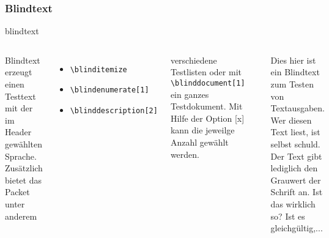 \subsubsection{Blindtext}
\begin{frame}[fragile]{blindtext}
	\begin{columns}[c]
			Blindtext erzeugt einen Testtext mit der im Header gewählten Sprache. 
			Zusätzlich bietet das Packet unter anderem 
			\begin{itemize}
				\item \texttt{\textbackslash blinditemize}
				\item \texttt{\textbackslash blindenumerate[1]}
				\item \texttt{\textbackslash blinddescription[2]}
			\end{itemize}
			verschiedene Testlisten oder mit \texttt{\textbackslash blinddocument[1]} ein 
			ganzes Testdokument. Mit Hilfe der Option [x] kann die jeweilge Anzahl gewählt 
			werden.
			\begin{lstlisting}[gobble=16]
				...
				\usepackage{blindtext}
				...
				
				...
				\blindtext[1]
				...
				
			\end{lstlisting}
			\begin{outputbox}
				Dies hier ist ein Blindtext zum Testen von Textausgaben. Wer diesen Text liest, ist selbst schuld. Der Text gibt lediglich den Grauwert der Schrift an. Ist das wirklich so? Ist es gleichgültig,...%
			\end{outputbox}
	\end{columns}
\end{frame}

